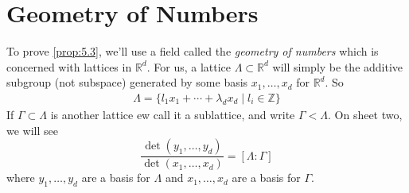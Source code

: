 \documentclass{article}
\numberwithin{equation}{section}
\begin{document}
\clearpage
\section{Geometry of Numbers}
\newlec
To prove \cref{prop:5.3}, we'll use a field called the \emph{geometry of numbers} which is concerned with lattices in $\mathbb{R}^d$.
For us, a lattice $\Lambda \subset \mathbb{R}^d$ will simply be the additive subgroup (not subspace) generated by some basis $x_1, \dotsc, x_d$ for $\mathbb{R}^d$.
So
\begin{align*}
  \Lambda = \{l_1 x_1 + \dotsb + \lambda_d x_d \mid l_i \in \mathbb{Z}\}
\end{align*}
If $\Gamma \subset \Lambda$ is another lattice ew call it a sublattice, and write $\Gamma < \Lambda$.
On sheet two, we will see
\begin{equation}
  \frac{\det(y_1, \dotsc, y_d)}{\det(x_1, \dotsc, x_d)} = [\Lambda: \Gamma] \label{eq:6.1}
\end{equation}
where $y_1, \dotsc, y_d$ are a basis for $\Lambda$ and $x_1, \dotsc, x_d$ are a basis for $\Gamma$.
\end{document}
